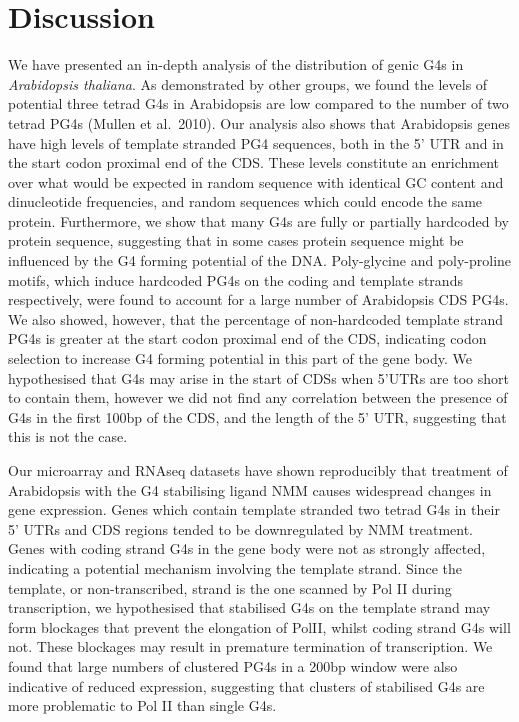 \documentclass[12pt,a4paper,]{report}
\begin{document}
\newpage

\hypertarget{discussion-3}{%
\chapter{Discussion}\label{discussion-3}}

We have presented an in-depth analysis of the distribution of genic G4s
in \emph{Arabidopsis thaliana}. As demonstrated by other groups, we
found the levels of potential three tetrad G4s in Arabidopsis are low
compared to the number of two tetrad PG4s (Mullen et al.~2010). Our
analysis also shows that Arabidopsis genes have high levels of template
stranded PG4 sequences, both in the 5' UTR and in the start codon
proximal end of the CDS. These levels constitute an enrichment over what
would be expected in random sequence with identical GC content and
dinucleotide frequencies, and random sequences which could encode the
same protein. Furthermore, we show that many G4s are fully or partially
hardcoded by protein sequence, suggesting that in some cases protein
sequence might be influenced by the G4 forming potential of the DNA.
Poly-glycine and poly-proline motifs, which induce hardcoded PG4s on the
coding and template strands respectively, were found to account for a
large number of Arabidopsis CDS PG4s. We also showed, however, that the
percentage of non-hardcoded template strand PG4s is greater at the start
codon proximal end of the CDS, indicating codon selection to increase G4
forming potential in this part of the gene body. We hypothesised that
G4s may arise in the start of CDSs when 5'UTRs are too short to contain
them, however we did not find any correlation between the presence of
G4s in the first 100bp of the CDS, and the length of the 5' UTR,
suggesting that this is not the case.

Our microarray and RNAseq datasets have shown reproducibly that
treatment of Arabidopsis with the G4 stabilising ligand NMM causes
widespread changes in gene expression. Genes which contain template
stranded two tetrad G4s in their 5' UTRs and CDS regions tended to be
downregulated by NMM treatment. Genes with coding strand G4s in the gene
body were not as strongly affected, indicating a potential mechanism
involving the template strand. Since the template, or non-transcribed,
strand is the one scanned by Pol II during transcription, we
hypothesised that stabilised G4s on the template strand may form
blockages that prevent the elongation of PolII, whilst coding strand G4s
will not. These blockages may result in premature termination of
transcription. We found that large numbers of clustered PG4s in a 200bp
window were also indicative of reduced expression, suggesting that
clusters of stabilised G4s are more problematic to Pol II than single
G4s.
\end{document}

